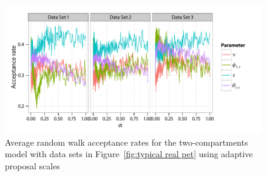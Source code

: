 \begin{figure}[t]
  \UseAltLinespread
  \includegraphics[width=\linewidth]{fig_src/Adaptive_Proposal}
  \caption[Acceptance rates of adaptive \protect\smc algorithms]
  {Average random walk acceptance rates for the two-compartments \pet model
    with data sets in Figure~\ref{fig:typical real pet} using adaptive
    proposal scales}
  \label{fig:pet adaptive proposal}
\end{figure}
